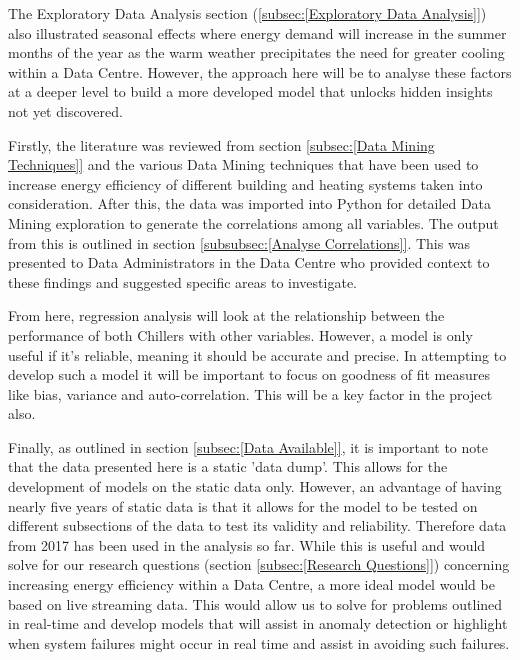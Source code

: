 \documentclass[12pt]{scrartcl}
\begin{document}
The Exploratory Data Analysis section (\ref{subsec:[Exploratory Data Analysis]}) also illustrated seasonal effects where energy demand will increase in the summer months of the year as the warm weather precipitates the need for greater cooling within a Data Centre. However, the approach here will be to analyse these factors at a deeper level to build a more developed  model that unlocks hidden insights not yet discovered.

Firstly, the literature was reviewed from section \ref{subsec:[Data Mining Techniques]} and the various Data Mining techniques that have been used to increase energy efficiency of different building and heating systems taken into consideration. After this, the data was imported into Python for detailed Data Mining exploration to generate the correlations among all variables. The output from this is outlined in section \ref{subsubsec:[Analyse Correlations]}. This was presented to Data Administrators in the Data Centre who provided context to these findings and suggested specific areas to investigate.   %

From here, regression analysis will look at the relationship between the performance of both Chillers with other variables. However, a model is only useful if it's reliable, meaning it should be accurate and precise. In attempting to develop such a model it will be important to focus on goodness of fit measures like bias, variance and auto-correlation. This will be a key factor in the project also.

Finally, as outlined in section \ref{subsec:[Data Available]}, it is important to note that the data presented here is a static 'data dump'. This allows for the development of models on the static data only. However, an advantage of having nearly five years of static data is that it allows for the model to be tested on different subsections of the data to test its validity and reliability.  Therefore data from 2017 has been used in the analysis so far. While this is useful and would solve for our research questions (section \ref{subsec:[Research Questions]}) concerning increasing energy efficiency within a Data Centre, a more ideal model would be based on live streaming data. This would allow us to solve for problems outlined in real-time and develop models that will assist in anomaly detection or highlight when system failures might occur in real time and assist in avoiding such failures. 
\end{document}
